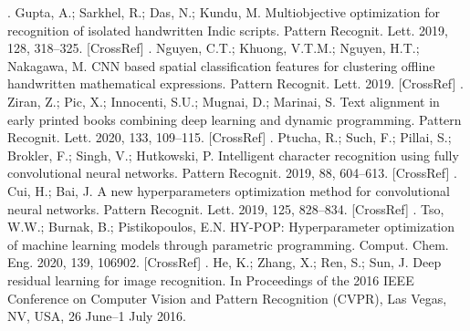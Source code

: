 . Gupta, A.; Sarkhel, R.; Das, N.; Kundu, M. Multiobjective optimization for recognition of isolated handwritten Indic
scripts. Pattern Recognit. Lett. 2019, 128, 318–325. [CrossRef]
\newline 
{}. Nguyen, C.T.; Khuong, V.T.M.; Nguyen, H.T.; Nakagawa, M. CNN based spatial classification features for clustering
offline handwritten mathematical expressions. Pattern Recognit. Lett. 2019. [CrossRef]
\newline 
{}. Ziran, Z.; Pic, X.; Innocenti, S.U.; Mugnai, D.; Marinai, S. Text alignment in early printed books combining deep
learning and dynamic programming. Pattern Recognit. Lett. 2020, 133, 109–115. [CrossRef]
\newline 
{}. Ptucha, R.; Such, F.; Pillai, S.; Brokler, F.; Singh, V.; Hutkowski, P. Intelligent character recognition using fully
convolutional neural networks. Pattern Recognit. 2019, 88, 604–613. [CrossRef]
\newline 
{}. Cui, H.; Bai, J. A new hyperparameters optimization method for convolutional neural networks. Pattern
Recognit. Lett. 2019, 125, 828–834. [CrossRef]
\newline 
{}. Tso, W.W.; Burnak, B.; Pistikopoulos, E.N. HY-POP: Hyperparameter optimization of machine learning models
through parametric programming. Comput. Chem. Eng. 2020, 139, 106902. [CrossRef]
\newline 
{}. He, K.; Zhang, X.; Ren, S.; Sun, J. Deep residual learning for image recognition. In Proceedings of the 2016 IEEE
Conference on Computer Vision and Pattern Recognition (CVPR), Las Vegas, NV, USA, 26 June–1 July 2016.
\newline 
\newline